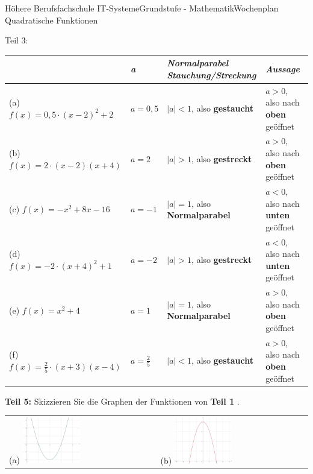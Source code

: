 \documentclass[oneside,openany,headings=optiontotoc,11pt,numbers=noenddot]{scrreprt}
\begin{document}
\begin{worksheet}{Höhere Berufsfachschule IT-Systeme}{Grundstufe - Mathematik}{Wochenplan Quadratische Funktionen}
\begin{framed}
			\newpage
			Teil 3:\\
			\begin{tabularx}{\textwidth}{X|l|X|X}
				& \textit{a} & \shortstack{\textit{Normalparabel}\\\textit{Stauchung/Streckung}} & \textit{Aussage}\\
				\hline
				(a) \(f(x) = 0,5\cdot(x-2)^2 + 2\) & \( a = 0,5\) & \(|a| < 1\), also \textbf{gestaucht} & \(a > 0\), also nach \textbf{oben} geöffnet\\
				\hline
				(b) \(f(x) = 2\cdot(x-2)(x+4)\) & \(a = 2\) & \(|a| > 1\), also \textbf{gestreckt} & \(a > 0\), also nach \textbf{oben} geöffnet\\
				\hline
				(c) \(f(x) = -x^2 + 8x -16\) & \( a = -1\) & \(|a| = 1\), also \textbf{Normalparabel} & \(a < 0\), also nach \textbf{unten} geöffnet \\
				\hline
				(d) \(f(x) = -2\cdot(x+4)^2 + 1\) & \(a = -2\) & \(|a| > 1\), also \textbf{gestreckt} & \(a < 0\), also nach \textbf{unten} geöffnet \\
				\hline
				(e) \(f(x) = x^2 + 4\) & \(a = 1\) & \(|a| = 1\), also \textbf{Normalparabel} & \(a > 0\), also nach \textbf{oben} geöffnet\\
				\hline
				(f) \(f(x) = \frac{2}{5}\cdot(x+3)(x-4)\) & \(a = \frac{2}{5}\) & \(|a| < 1\), also \textbf{gestaucht} & \(a > 0\), also nach \textbf{oben} geöffnet\\
			\end{tabularx}
		\end{framed}
		\newpage
		\begin{framed}
			\noindent
			\textbf{Teil 5:} Skizzieren Sie die Graphen der Funktionen von \textbf{Teil 1} .\\
			\begin{tabularx}{\textwidth}{XX}
				(a) \includegraphics[width=0.4\textwidth, align=t]{../99_Bilder/WP5DiAL.jpg} & (b) \includegraphics[width=0.4\textwidth, align=t]{../99_Bilder/WP5DiBL.jpg}\\

\end{tabularx}
\end{framed}
\end{worksheet}
\end{document}
